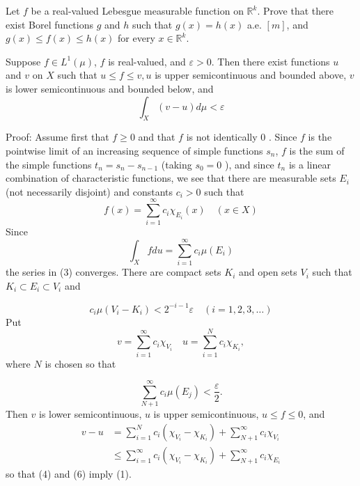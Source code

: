 \documentclass[12pt, a4paper, oneside]{book}
\begin{document}
\begin{theorem}
    Let $f$ be a real-valued Lebesgue measurable function on $\mathbb{R}^k$. Prove that there exist Borel functions $g$ and $h$ such that $g(x)=h(x)$ a.e. $[m]$, and $g(x) \leq f(x) \leq h(x)$ for every $x \in \mathbb{R}^k$.
\end{theorem}

\begin{theorem}
    Suppose $f \in L^{1}(\mu)$, $f$ is real-valued, and $\varepsilon>0$. Then there exist functions $u$ and $v$ on $X$ such that $u \leq f \leq v, u$ is upper semicontinuous and bounded above, $v$ is lower semicontinuous and bounded below, and
    \begin{equation}
        \int_{X}(v-u) d \mu<\varepsilon \tag{1}
    \end{equation}

    Proof:
    Assume first that $f \geq 0$ and that $f$ is not identically 0 . Since $f$ is the pointwise limit of an increasing sequence of simple functions $s_{n}$, $f$ is the sum of the simple functions $t_{n}=s_{n}-s_{n-1}$ (taking $s_{0}=0$ ), and since $t_{n}$ is a linear combination of characteristic functions, we see that there are measurable sets $E_{i}$ (not necessarily disjoint) and constants $c_{i}>0$ such that
    \begin{equation}
        f(x)=\sum_{i=1}^{\infty} c_{i} \chi_{E_{i}}(x) \quad(x \in X) \tag{2}
    \end{equation}
    Since
    \begin{equation}
        \int_{X} f d u=\sum_{i=1}^{\infty} c_{i} \mu\left(E_{i}\right) \tag{3}
    \end{equation}
    the series in (3) converges. There are compact sets $K_{i}$ and open sets $V_{i}$ such that $K_{i} \subset E_{i} \subset V_{i}$ and

    \begin{equation}
        c_{i} \mu\left(V_{i}-K_{i}\right)<2^{-i-1} \varepsilon \quad(i=1,2,3, \ldots) \tag{4}
    \end{equation}
    Put
    \begin{equation}
        v=\sum_{i=1}^{\infty} c_{i} \chi_{V_{i}} \quad u=\sum_{i=1}^{N} c_{i} \chi_{K_{i}}, \tag{5}
    \end{equation}
    where $N$ is chosen so that

    \begin{equation}
        \sum_{N+1}^{\infty} c_{i} \mu\left(E_{j}\right)<\frac{\varepsilon}{2} . \tag{6}
    \end{equation}
    Then $v$ is lower semicontinuous, $u$ is upper semicontinuous, $u \leq f \leq 0$, and
    $$
        \begin{aligned}
            v-u & =\sum_{i=1}^{N} c_{i}\left(\chi_{V_{i}}-\chi_{K_{i}}\right)+\sum_{N+1}^{\infty} c_{i} \chi_{V_{i}}          \\
                & \leq \sum_{i=1}^{\infty} c_{i}\left(\chi_{V_{i}}-\chi_{K_{i}}\right)+\sum_{N+1}^{\infty} c_{i} \chi_{E_{i}}
        \end{aligned}
    $$
    so that (4) and (6) imply (1).


\end{theorem}
\end{document}
